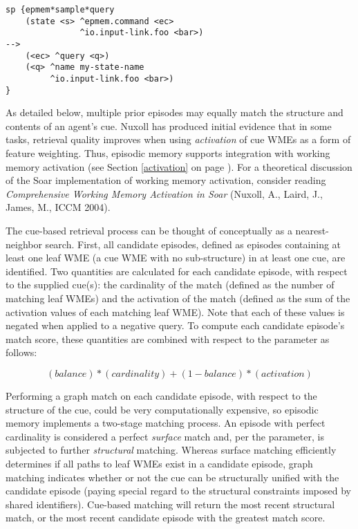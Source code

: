 \begin{verbatim}
sp {epmem*sample*query
    (state <s> ^epmem.command <ec>
               ^io.input-link.foo <bar>)
-->
    (<ec> ^query <q>)
    (<q> ^name my-state-name
         ^io.input-link.foo <bar>)
}
\end{verbatim}

As detailed below, multiple prior episodes may equally match the structure and contents of an agent's cue. 
Nuxoll has produced initial evidence that in some tasks, retrieval quality improves when using \emph{activation} of cue WMEs as a form of feature weighting.  
Thus, episodic memory supports integration with working memory activation (see Section \ref{activation} on page \pageref{activation}).  
For a theoretical discussion of the Soar implementation of working memory activation, consider reading \emph{Comprehensive Working Memory Activation in Soar} (Nuxoll, A., Laird, J., James, M., ICCM 2004).

The cue-based retrieval process can be thought of conceptually as a nearest-neighbor search. 
First, all candidate episodes, defined as episodes containing at least one leaf WME (a cue WME with no sub-structure) in at least one cue, are identified.  
Two quantities are calculated for each candidate episode, with respect to the supplied cue(s): the cardinality of the match (defined as the number of matching leaf WMEs) and the activation of the match (defined as the sum of the activation values of each matching leaf WME).  
Note that each of these values is negated when applied to a negative query.  
To compute each candidate episode's match score, these quantities are combined with respect to the  parameter as follows:

$$(balance)*(cardinality) + (1-balance)*(activation)$$

Performing a graph match on each candidate episode, with respect to the structure of the cue, could be very computationally expensive, so episodic memory implements a two-stage matching process.
An episode with perfect cardinality is considered a perfect \emph{surface} match and, per the  parameter, is subjected to further \emph{structural} matching.  
Whereas surface matching efficiently determines if all paths to leaf WMEs exist in a candidate episode, graph matching indicates whether or not the cue can be structurally unified with the candidate episode (paying special regard to the structural constraints imposed by shared identifiers).  
Cue-based matching will return the most recent structural match, or the most recent candidate episode with the greatest match score.

